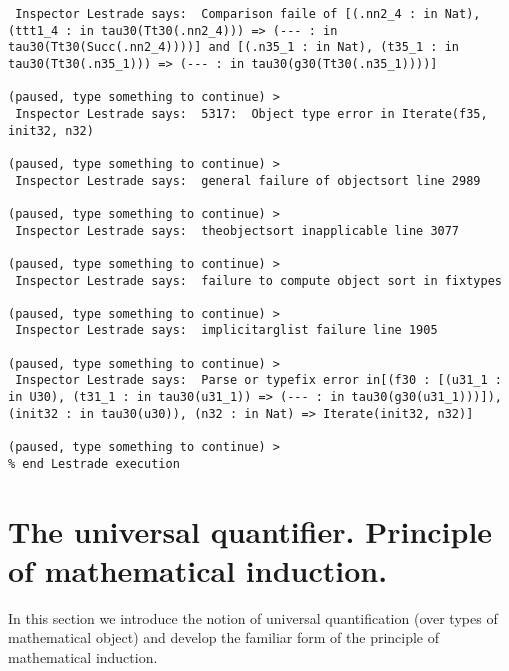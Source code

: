 \documentclass[12pt]{article}
\begin{document}
\begin{verbatim}
 Inspector Lestrade says:  Comparison faile of [(.nn2_4 : in Nat), (ttt1_4 : in tau30(Tt30(.nn2_4))) => (--- : in tau30(Tt30(Succ(.nn2_4))))] and [(.n35_1 : in Nat), (t35_1 : in tau30(Tt30(.n35_1))) => (--- : in tau30(g30(Tt30(.n35_1))))]

(paused, type something to continue) >
 Inspector Lestrade says:  5317:  Object type error in Iterate(f35, init32, n32)

(paused, type something to continue) >
 Inspector Lestrade says:  general failure of objectsort line 2989

(paused, type something to continue) >
 Inspector Lestrade says:  theobjectsort inapplicable line 3077

(paused, type something to continue) >
 Inspector Lestrade says:  failure to compute object sort in fixtypes

(paused, type something to continue) >
 Inspector Lestrade says:  implicitarglist failure line 1905

(paused, type something to continue) >
 Inspector Lestrade says:  Parse or typefix error in[(f30 : [(u31_1 : in U30), (t31_1 : in tau30(u31_1)) => (--- : in tau30(g30(u31_1)))]), (init32 : in tau30(u30)), (n32 : in Nat) => Iterate(init32, n32)]

(paused, type something to continue) >
% end Lestrade execution
\end{verbatim}

\section{The universal quantifier.  Principle of mathematical induction.}

In this section we introduce the notion of universal quantification (over types of mathematical object)  and develop the familiar form of the principle of mathematical induction.
\end{document}
